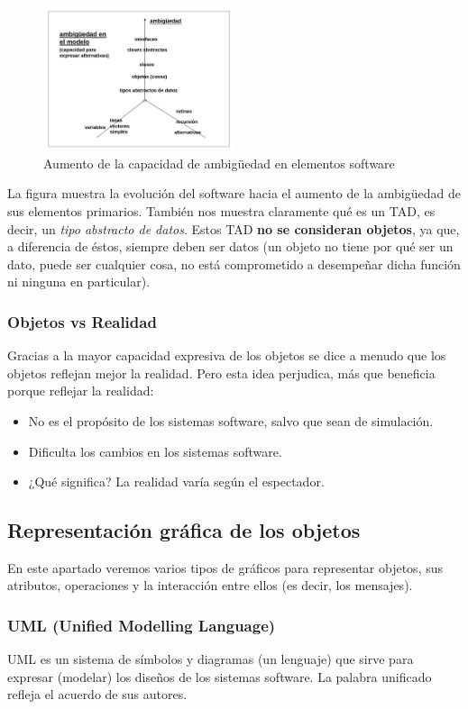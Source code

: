 \begin{figure}[ht!]  \centering
\includegraphics[width=0.5\textwidth]{images/fig111}
  \caption{Aumento de la capacidad de ambigüedad en elementos
software}
  \label{fig:111}
\end{figure}

La figura muestra la evolución del software hacia el aumento de la
ambigüedad de sus elementos primarios.  También nos muestra claramente
qué es un TAD, es decir, un \emph{tipo abstracto de datos}. Estos TAD
\textbf{no se consideran objetos}, ya que, a diferencia de éstos,
siempre deben ser datos (un objeto no tiene por qué ser un dato, puede
ser cualquier cosa, no está comprometido a desempeñar dicha función ni
ninguna en particular).

\subsubsection{Objetos vs Realidad} Gracias a la mayor capacidad
expresiva de los objetos se dice a menudo que los objetos reflejan
mejor la realidad.  Pero esta idea perjudica, más que beneficia porque
reflejar la realidad:
\begin{itemize}
\item No es el propósito de los sistemas software, salvo que sean de
simulación.
\item Dificulta los cambios en los sistemas software.
\item ¿Qué significa? La realidad varía según el espectador.
\end{itemize}

\newpage

\subsection{Representación gráfica de los objetos}
En este apartado veremos varios tipos de gráficos para representar
objetos, sus atributos, operaciones y la interacción entre ellos (es
decir, los mensajes).
\subsubsection{UML (Unified Modelling Language)}
UML es un sistema de símbolos y diagramas (un lenguaje) que sirve para
expresar (modelar) los diseños de los sistemas software. La palabra
unificado refleja el acuerdo de sus autores.

